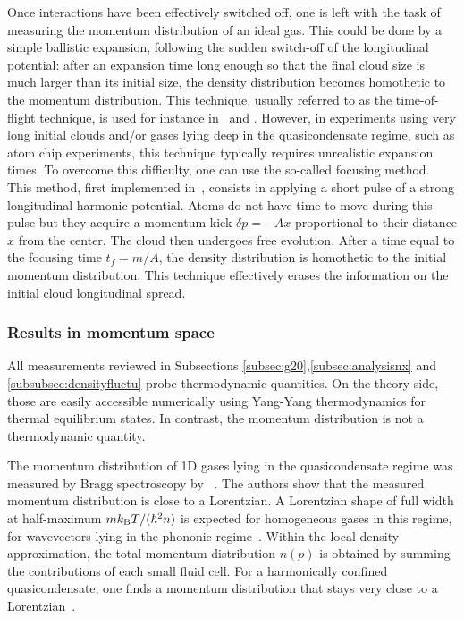 \documentclass[onecolumn,amsfonts,showpacs,superscriptaddress]{revtex4-1}
\begin{document}
Once interactions have been effectively switched off, one is left with the task of measuring the momentum distribution of an ideal gas. 
This could be done by a simple ballistic expansion, following the sudden switch-off of the longitudinal potential: after an expansion time
long enough so that the final cloud size is much larger than its initial size, the density distribution becomes homothetic to the momentum distribution. This technique, usually referred to as the time-of-flight technique, is used for instance in~\citep{fabbri_momentum-resolved_2011} and \citep{wilson_observation_2020,malvania2020generalized}.
However, in experiments using very long initial clouds and/or gases lying deep in the quasicondensate regime, such as atom chip experiments, this technique typically requires unrealistic expansion times. To overcome this difficulty, one can use the so-called 
focusing method. This method, first implemented in~\citep{shvarchuck_bose-einstein_2002}, consists in applying a short pulse of a strong longitudinal harmonic potential. Atoms do not have time to move during this pulse but they acquire a momentum kick $\delta p =-A x$ proportional to their distance $x$ from the center. The cloud then undergoes free evolution. After a time equal to the focusing time $t_f=m/A$, the density distribution is homothetic to the initial momentum distribution.
This technique effectively erases the information on the initial cloud longitudinal spread.

\subsubsection{Results in momentum space}
All measurements reviewed in Subsections \ref{subsec:g20},\ref{subsec:analysisnx} and \ref{subsubsec:densityfluctu} %
probe 
thermodynamic quantities. On the theory side, those are 
easily accessible numerically using Yang-Yang thermodynamics for thermal equilibrium states.
In contrast, the momentum distribution is not a thermodynamic quantity. 

The momentum distribution of 1D gases lying in the quasicondensate regime was measured by Bragg spectroscopy by ~\cite{fabbri_momentum-resolved_2011}. %
The authors show that the measured momentum distribution is close to a Lorentzian. A Lorentzian shape of full width at half-maximum $m k_{\rm B} T/(\hbar^2 n)$
is expected for homogeneous gases in this regime, for wavevectors lying in the phononic regime~\citep{jacqmin_momentum_2012}.  Within the local density approximation, the total momentum distribution $n(p)$ is obtained by summing the contributions of each small fluid cell. For a harmonically confined quasicondensate, one finds a momentum distribution that stays very close to a Lorentzian~\citep{jacqmin_momentum_2012}.
\end{document}
